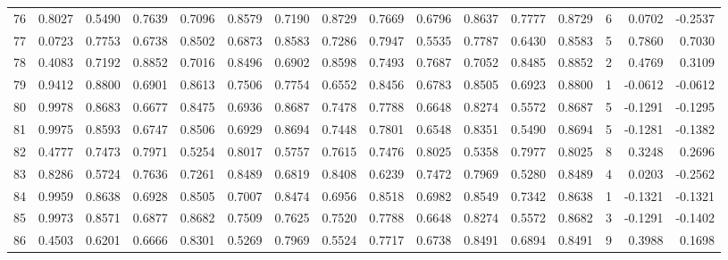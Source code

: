 \begin{tabular}{lrrrrrrrrrrrrrrr}
76  &      0.8027 &  0.5490 &  0.7639 &  0.7096 &  0.8579 &  0.7190 &  0.8729 &  0.7669 &  0.6796 &  0.8637 &   0.7777 &     0.8729 &      6 &                    0.0702 &                    -0.2537 \\
77  &      0.0723 &  0.7753 &  0.6738 &  0.8502 &  0.6873 &  0.8583 &  0.7286 &  0.7947 &  0.5535 &  0.7787 &   0.6430 &     0.8583 &      5 &                    0.7860 &                     0.7030 \\
78  &      0.4083 &  0.7192 &  0.8852 &  0.7016 &  0.8496 &  0.6902 &  0.8598 &  0.7493 &  0.7687 &  0.7052 &   0.8485 &     0.8852 &      2 &                    0.4769 &                     0.3109 \\
79  &      0.9412 &  0.8800 &  0.6901 &  0.8613 &  0.7506 &  0.7754 &  0.6552 &  0.8456 &  0.6783 &  0.8505 &   0.6923 &     0.8800 &      1 &                   -0.0612 &                    -0.0612 \\
80  &      0.9978 &  0.8683 &  0.6677 &  0.8475 &  0.6936 &  0.8687 &  0.7478 &  0.7788 &  0.6648 &  0.8274 &   0.5572 &     0.8687 &      5 &                   -0.1291 &                    -0.1295 \\
81  &      0.9975 &  0.8593 &  0.6747 &  0.8506 &  0.6929 &  0.8694 &  0.7448 &  0.7801 &  0.6548 &  0.8351 &   0.5490 &     0.8694 &      5 &                   -0.1281 &                    -0.1382 \\
82  &      0.4777 &  0.7473 &  0.7971 &  0.5254 &  0.8017 &  0.5757 &  0.7615 &  0.7476 &  0.8025 &  0.5358 &   0.7977 &     0.8025 &      8 &                    0.3248 &                     0.2696 \\
83  &      0.8286 &  0.5724 &  0.7636 &  0.7261 &  0.8489 &  0.6819 &  0.8408 &  0.6239 &  0.7472 &  0.7969 &   0.5280 &     0.8489 &      4 &                    0.0203 &                    -0.2562 \\
84  &      0.9959 &  0.8638 &  0.6928 &  0.8505 &  0.7007 &  0.8474 &  0.6956 &  0.8518 &  0.6982 &  0.8549 &   0.7342 &     0.8638 &      1 &                   -0.1321 &                    -0.1321 \\
85  &      0.9973 &  0.8571 &  0.6877 &  0.8682 &  0.7509 &  0.7625 &  0.7520 &  0.7788 &  0.6648 &  0.8274 &   0.5572 &     0.8682 &      3 &                   -0.1291 &                    -0.1402 \\
86  &      0.4503 &  0.6201 &  0.6666 &  0.8301 &  0.5269 &  0.7969 &  0.5524 &  0.7717 &  0.6738 &  0.8491 &   0.6894 &     0.8491 &      9 &                    0.3988 &                     0.1698 \\

\end{tabular}
